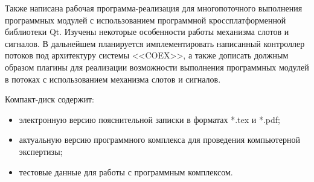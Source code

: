 Также написана рабочая программа-реализация для многопоточного выполнения программных модулей с использованием программной кроссплатформенной библиотеки Qt. Изучены некоторые особенности работы механизма слотов и сигналов. В дальнейшем планируется имплементировать написанный контроллер потоков под архитектуру системы <<COEX>>, а также дописать должным образом плагины для реализации возможности выполнения программных модулей в потоках с использованием механизма слотов и сигналов.
 
 
 \newpage
 \renewcommand{\refname}{Список использованных источников}
 

 Компакт-диск содержит: 
 \begin{itemize}
 \item электронную версию пояснительной записки в форматах *.tex и *.pdf;
 \item актуальную версию программного комплекса для проведения компьютерной экспертизы;
 \item тестовые данные для работы с программным комплексом.
 \end{itemize}
 
 
 
 
  
 
 

